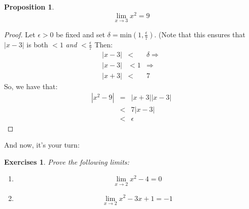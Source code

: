 \documentclass[12pt,a4paper]{article} %
\newtheorem{prop}{Proposition}
\newtheorem{exer}{Exercises}
\begin{document}
\begin{prop}
$$\lim_{x\rightarrow 3}x^2 = 9$$
\end{prop} 
\begin{proof}
Let $\epsilon>0$ be fixed and set $\delta =\mathrm{min}\left(1,\frac{\epsilon}{7}\right)$.  (Note that this ensures that $|x-3|$ is both $<1$ \emph{and} $<\frac{\epsilon}{7}$ Then:
\begin{eqnarray*}
|x-3|&<&\delta\Rightarrow\\
|x-3|&<1& \Rightarrow\\
|x+3| &<& 7 
\end{eqnarray*}
So, we have that:
\begin{eqnarray*}
|x^2-9|&=&|x+3||x-3|\\
&<& 7|x-3|\\
&<& \epsilon
\end{eqnarray*}
\end{proof}
And now, it's your turn:
\begin{exer}
Prove the following limits:
\begin{enumerate}
\item $$\lim_{x\rightarrow 2} x^2-4=0$$
\item $$\lim_{x\rightarrow 2} x^2-3x+1=-1$$
\end{enumerate}
\end{exer}
\end{document}
